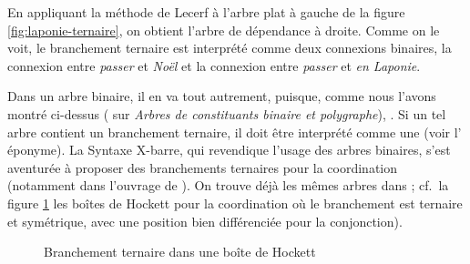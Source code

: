 {    \pagebreak En appliquant la méthode de Lecerf à l’arbre plat à gauche de la figure \ref{fig:laponie-ternaire}, on obtient l’arbre de dépendance à droite. Comme on le voit, le branchement ternaire est interprété comme deux connexions binaires, la connexion entre \textit{passer} et \textit{Noël} et la connexion entre \textit{passer} et \textit{en Laponie}.

    Dans un arbre binaire, il en va tout autrement, puisque, comme nous l’avons montré ci-dessus ( sur \textit{Arbres de constituants binaire et polygraphe}), . Si un tel arbre contient un branchement ternaire, il doit être interprété comme une  (voir l’ éponyme). La Syntaxe X-barre, qui revendique l’usage des arbres binaires, s’est aventurée à proposer des branchements ternaires pour la coordination (notamment dans l'ouvrage de \citealt{jackendoff1977x}). On trouve déjà les mêmes arbres dans \citealt{hockett1958course} ; cf.\ la figure \ref{fig:hockett-coord} les boîtes de Hockett pour la coordination où le branchement est ternaire et symétrique, avec une position bien différenciée pour la conjonction).

\begin{figure}[H]
\caption{\label{fig:hockett-coord}Branchement ternaire dans une boîte de Hockett}
\end{figure}


}
